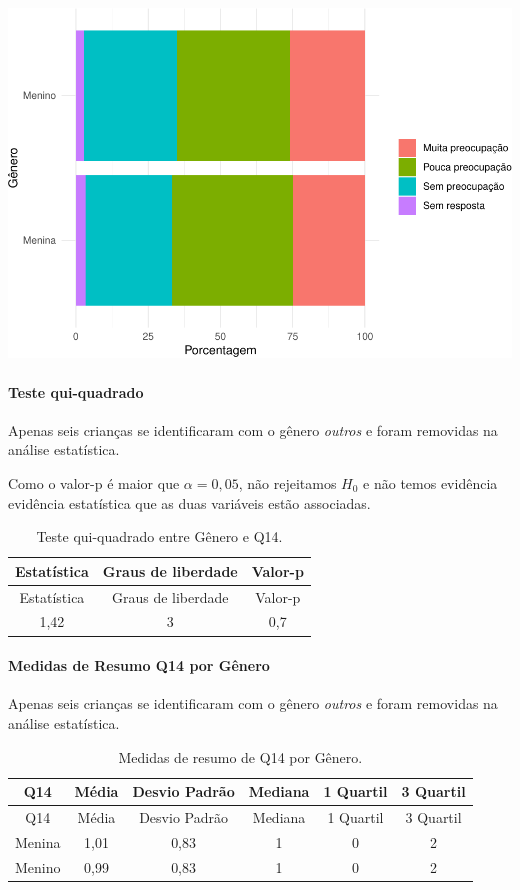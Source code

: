 \documentclass[]{article}
\let\oldparagraph\paragraph
\renewcommand{\paragraph}[1]{\oldparagraph{#1}\mbox{}}
\begin{document}
\begin{center}\includegraphics[width=0.75\linewidth]{relatorio_files/figure-latex/unnamed-chunk-68-1} \end{center}

\hypertarget{teste-qui-quadrado-3}{%
\paragraph{Teste qui-quadrado}\label{teste-qui-quadrado-3}}

Apenas seis crianças se identificaram com o gênero \emph{outros} e foram removidas na análise estatística.

Como o valor-p é maior que \(\alpha=0,05\), não rejeitamos \(H_0\) e não temos evidência evidência estatística que as duas variáveis estão associadas.

\begin{longtable}[]{@{}ccc@{}}
\caption{\label{tab:unnamed-chunk-69}Teste qui-quadrado entre Gênero e Q14.}\tabularnewline
\toprule
Estatística & Graus de liberdade & Valor-p\tabularnewline
\midrule
\endfirsthead
\toprule
Estatística & Graus de liberdade & Valor-p\tabularnewline
\midrule
\endhead
1,42 & 3 & 0,7\tabularnewline
\bottomrule
\end{longtable}

\cleardoublepage

\hypertarget{medidas-de-resumo-q14-por-guxeanero}{%
\paragraph{Medidas de Resumo Q14 por Gênero}\label{medidas-de-resumo-q14-por-guxeanero}}

Apenas seis crianças se identificaram com o gênero \emph{outros} e foram removidas na análise estatística.

\begin{longtable}[]{@{}cccccc@{}}
\caption{\label{tab:unnamed-chunk-70}Medidas de resumo de Q14 por Gênero.}\tabularnewline
\toprule
Q14 & Média & Desvio Padrão & Mediana & 1 Quartil & 3 Quartil\tabularnewline
\midrule
\endfirsthead
\toprule
Q14 & Média & Desvio Padrão & Mediana & 1 Quartil & 3 Quartil\tabularnewline
\midrule
\endhead
Menina & 1,01 & 0,83 & 1 & 0 & 2\tabularnewline
Menino & 0,99 & 0,83 & 1 & 0 & 2\tabularnewline
\bottomrule
\end{longtable}
\end{document}
